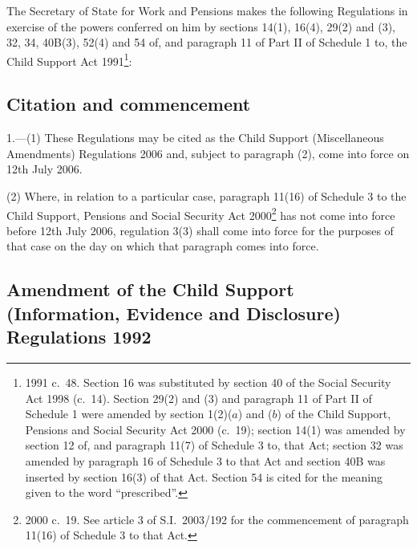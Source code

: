 \documentclass[12pt,a4paper]{article}
\title{\regstitle}
\author{S.I.\ 2006 No.\ 1520}
\date{Made
13th June 2006\\
Laid before Parliament
16th June 2006\\
Coming into force
in accordance with regulation 1
}
\begin{document}
\maketitle

\noindent
The Secretary of State for Work and Pensions makes the following Regulations in exercise of the powers conferred on him by sections 14(1), 16(4), 29(2) and (3), 32, 34, 40B(3), 52(4) and 54 of, and paragraph 11 of Part II of Schedule 1 to, the Child Support Act 1991\footnote{1991 c.\ 48. Section 16 was substituted by section 40 of the Social Security Act 1998 (c.\ 14). Section 29(2) and (3) and paragraph 11 of Part II of Schedule 1 were amended by section 1(2)($a$)  and ($b$)  of the Child Support, Pensions and Social Security Act 2000 (c.\ 19); section 14(1) was amended by section 12 of, and paragraph 11(7) of Schedule 3 to, that Act; section 32 was amended by paragraph 16 of Schedule 3 to that Act and section 40B was inserted by section 16(3) of that Act. Section 54 is cited for the meaning given to the word “prescribed”.}: 

{\sloppy

\tableofcontents

}

\bigskip

\setcounter{secnumdepth}{-2}

\subsection[1. Citation and commencement]{Citation and commencement}

1.---(1)  These Regulations may be cited as the Child Support (Miscellaneous Amendments) Regulations 2006 and, subject to paragraph (2), come into force on 12th July 2006.

(2) Where, in relation to a particular case, paragraph 11(16) of Schedule 3 to the Child Support, Pensions and Social Security Act 2000\footnote{2000 c.\ 19. See article 3 of S.I.\ 2003/192 for the commencement of paragraph 11(16) of Schedule 3 to that Act.} has not come into force before 12th July 2006, regulation 3(3) shall come into force for the purposes of that case on the day on which that paragraph comes into force.

\subsection[2. Amendment of the Child Support (Information, Evidence and Disclosure) Regulations 1992]{Amendment of the Child Support (Information, Evidence and Disclosure) Regulations 1992}
\end{document}

